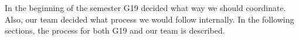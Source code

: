 In the beginning of the semester \gls{G19} decided what way we should coordinate. 
Also, our team decided what process we would follow internally.
In the following sections, the process for both {G19} and our team is described.  